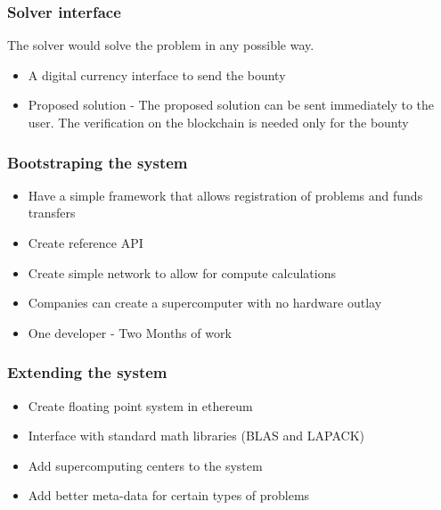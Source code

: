 \documentclass{beamer}
\begin{document}
\begin{frame}
  \frametitle{Solver interface}
The solver would solve the problem in any possible way.
  \begin{itemize}
  \item A digital currency interface to send the bounty
  \item Proposed solution - The proposed solution can be sent
    immediately to the user.  The verification on the blockchain is
    needed only for the bounty
  \end{itemize}
\end{frame}
\begin{frame}
  \frametitle{Bootstraping the system}
  \begin{itemize}
    \item Have a simple framework that allows registration of problems and
      funds transfers
    \item Create reference API
    \item Create simple network to allow for compute calculations
    \item Companies can create a supercomputer with no hardware outlay
    \item One developer - Two Months of work
  \end{itemize}
\end{frame}
\begin{frame}
  \frametitle{Extending the system}
  \begin{itemize}
  \item Create floating point system in ethereum
  \item Interface with standard math libraries (BLAS and LAPACK)
  \item Add supercomputing centers to the system
  \item Add better meta-data for certain types of problems
  \end{itemize}
\end{frame}
\end{document}
